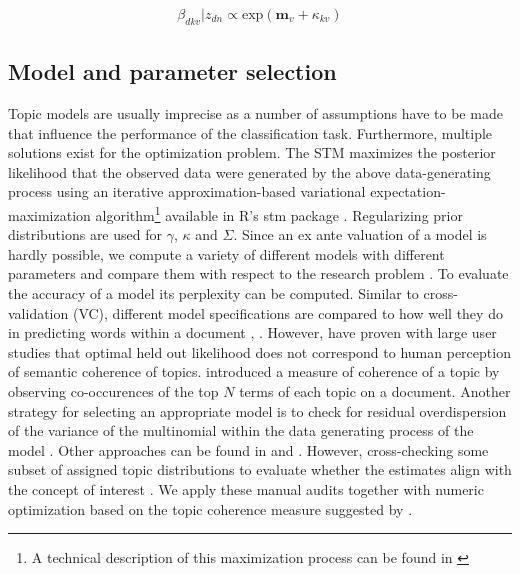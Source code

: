 \documentclass[12pt,a4paper,notitlepage]{article}
\begin{document}
\begin{align*}
	\beta_{dkv}|z_{dn}\propto\textrm{exp}(\boldsymbol{m}_v+\kappa_{kv})
\end{align*}


\subsection{Model and parameter selection}

Topic models are usually imprecise as a number of assumptions have to be made that influence the performance of the classification task. Furthermore, multiple solutions exist for the optimization problem. The STM maximizes the posterior likelihood that the observed data were generated by the above data-generating process using an iterative approximation-based variational expectation-maximization algorithm\footnote{A technical description of this maximization process can be found in \citet{roberts_model_2016}} available in R's stm package \citep{roberts_stm:_2016}. Regularizing prior distributions are used for $\gamma$, $\kappa$ and $\Sigma$. Since an ex ante valuation of a model is hardly possible, we compute a variety of different models with different parameters and compare them with respect to the research problem \citep{gentzkow_text_2017}. To evaluate the accuracy of a model its perplexity can be computed. Similar to cross-validation (VC), different model specifications are compared to how well they do in predicting words within a document \citep{asuncion_smoothing_2012}, \citep{wallach_evaluation_2009}. However, \citet{chang_reading_2009} have proven with large user studies that optimal held out likelihood does not correspond to human perception of semantic coherence of topics. \cite{mimno_optimizing_2011} introduced a measure of coherence of a topic by observing co-occurences of the top $N$ terms of each topic on a document. Another strategy for selecting an appropriate model is to check for residual overdispersion of the variance of the multinomial within the data generating process of the model \citep{taddy_estimation_2012}. Other approaches can be found in \citet{airoldi_reconceptualizing_2010} and \citet{teh_hierarchical_2006}. However, cross-checking some subset of assigned topic distributions to evaluate whether the estimates align with the concept of interest \citep{gentzkow_text_2017}. We apply these manual audits together with numeric optimization based on the topic coherence measure suggested by \citet{mimno_optimizing_2011}. 
\end{document}
